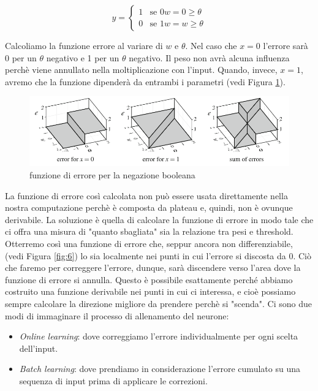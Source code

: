 \documentclass[10pt,a4paper]{article}
\begin{document}
\begin{equation}
	y = \begin{cases}
    1 & \text{se } 0w = 0 \geq \theta \\
    0 & \text{se } 1w = w \geq \theta
   \end{cases}
\end{equation} 

Calcoliamo la funzione errore al variare di $w$ e $\theta$. Nel caso che $x = 0$ l'errore sarà 0 per un $\theta$ negativo e 1 per un $\theta$ negativo. Il peso non avrà alcuna influenza perchè viene annullato nella moltiplicazione con l'input. Quando, invece, $x = 1$, avremo che la funzione dipenderà da entrambi i parametri (vedi Figura \ref{fig:5}).

\begin{figure}
\centering
\includegraphics[scale=0.4]{img/error1.png}
\caption{funzione di errore per la negazione booleana}
\label{fig:5}
\end{figure}

La funzione di errore così calcolata non può essere usata direttamente nella nostra computazione perchè è composta da plateau e, quindi, non è ovunque derivabile. La soluzione è quella di calcolare la funzione di errore in modo tale che ci offra una misura di "quanto sbagliata" sia la relazione tra pesi e threshold. Otterremo così una funzione di errore che, seppur ancora non differenziabile, (vedi Figura \ref{fig:6}) lo sia localmente nei punti in cui l'errore si discosta da $0$. Ciò che faremo per correggere l'errore, dunque, sarà discendere verso l'area dove la funzione di errore si annulla. Questo è possibile esattamente perché abbiamo costruito una funzione derivabile nei punti in cui ci interessa, e cioè possiamo sempre calcolare la direzione migliore da prendere perchè si "scenda".
Ci sono due modi di immaginare il processo di allenamento del neurone:

\begin{itemize}
\item{\emph{Online learning}: dove correggiamo l'errore individualmente per ogni scelta dell'input.}
\item{\emph{Batch learning}: dove prendiamo in considerazione l'errore cumulato su una sequenza di input prima di applicare le correzioni.}
\end{itemize}
\end{document}
